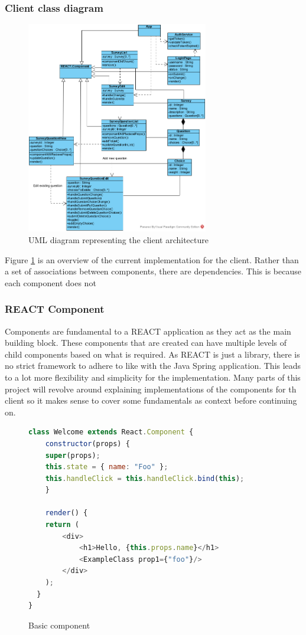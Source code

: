 \subsubsection{Client class diagram}
\begin{figure}[ht]
    \centering
    \includegraphics[width=300px]{images/client_architecture.png}
    \caption{UML diagram representing the client architecture}
    \label{clientarch}
\end{figure}

\noindent
Figure \ref{clientarch} is an overview of the current implementation for the client.
Rather than a set of associations between components, there are dependencies.
This is because each component does not %

\subsubsection{REACT Component}
Components are fundamental to a REACT application as they act as the main building block.
These components that are created can have multiple levels of child components based on what is required.
As REACT is just a library, there is no strict framework to adhere to like with the Java Spring application.
This leads to a lot more flexibility and simplicity for the implementation.
Many parts of this project will revolve around explaining implementations of the components for th client so it makes sense to cover
some fundamentals as context before continuing on.

\begin{figure}[ht]
    \centering
    \begin{lstlisting}[language=Javascript]
class Welcome extends React.Component {
    constructor(props) {
    super(props);
    this.state = { name: "Foo" };
    this.handleClick = this.handleClick.bind(this);
    }
    
    render() {
    return (
        <div>
            <h1>Hello, {this.props.name}</h1>
            <ExampleClass prop1={"foo"}/>
        </div>
    );
  }
}
    \end{lstlisting}
    \caption{Basic component}   
    \label{basiccomponent}
\end{figure}

